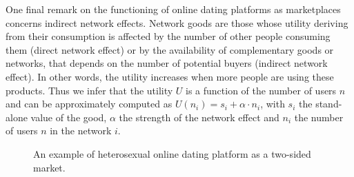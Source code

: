 One final remark on the functioning of online dating platforms as
marketplaces concerns indirect network effects. Network goods are
those whose utility deriving from their consumption is affected by
the number of other people consuming them (direct network effect)
or by the availability of complementary goods or networks, that depends
on the number of potential buyers (indirect network effect). In other
words, the utility increases when more people are using these products.
Thus we infer that the utility $U$ is a function of the number of
users $n$ and can be approximately computed as $U\left(n_{i}\right)=s_{i}+\alpha\cdot n_{i}$,
with $s_{i}$ the stand-alone value of the good, $\alpha$ the strength
of the network effect and $n_{i}$ the number of users $n$ in the
network $i$.
\begin{figure}[h]
\begin{centering}
\par\end{centering}
\centering{}\caption{An example of heterosexual online dating platform as a two-sided market.\label{fig:An-example-2sided-mkt}}
\end{figure}

